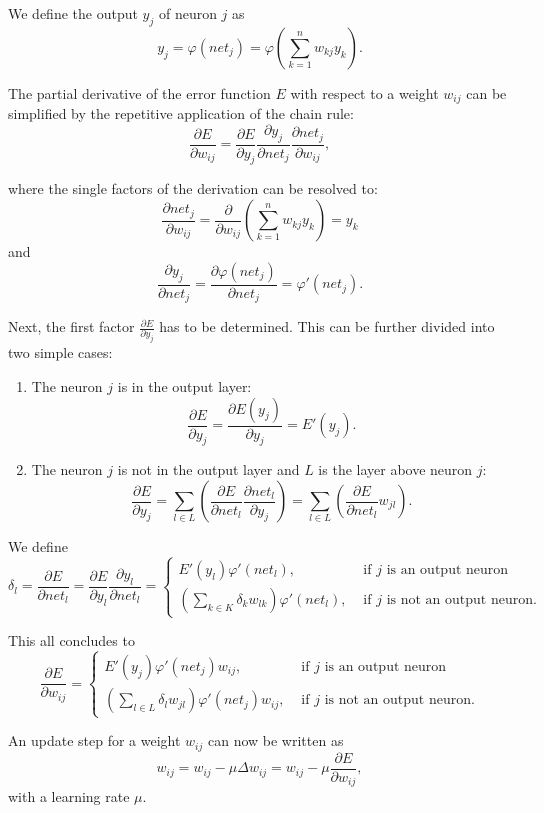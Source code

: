 We define the output $y_j$ of neuron $j$ as
\[
	y_j = \varphi(net_j) = \varphi(\sum_{k=1}^n w_{kj} y_k) .
\]
 
The partial derivative of the error function $E$ with respect to a weight $w_{ij}$ can be simplified by the repetitive application of the chain rule:
\[
	\frac{\partial E}{\partial w_{ij}} = \frac{\partial E}{\partial y_j} \frac{\partial y_j}{\partial net_j} \frac{\partial net_j}{\partial w_{ij}} ,
\]
 
where the single factors of the derivation can be resolved to:
\[
	\frac{\partial net_j}{\partial w_{ij}} = \frac{\partial}{\partial w_{ij}} ( \sum_{k=1}^n w_{kj} y_k ) = y_k
\]
and 
\[
	\frac{\partial y_j}{\partial net_j} =  \frac{\partial \varphi(net_j)}{\partial net_j} = \varphi'(net_j).
\]


Next, the first factor $\frac{\partial E}{\partial y_j}$ has to be determined. This can be further divided into two simple cases:
\begin{enumerate}
\item The neuron $j$ is in the output layer:
\[
\frac{\partial E}{\partial y_j} = \frac{\partial E(y_j)}{\partial y_j} = E'(y_j).
\] 

\item The neuron $j$ is not in the output layer and $L$ is the layer above neuron $j$:
\[
\frac{\partial E}{\partial y_j} = \sum_{l \in L}( \frac{\partial E}{\partial net_l} \frac{\partial net_l}{\partial y_j} )  = \sum_{l \in L}( \frac{\partial E}{\partial net_l} w_{jl} ).
\] 
\end{enumerate}
 
We define 
\[
\delta_l = \frac{\partial E}{\partial net_l} = \frac{\partial E}{\partial y_l} \frac{\partial y_l}{\partial net_l} =
\begin{cases}
E'(y_l) \varphi'(net_l), & \text{  if } j \text{ is an output neuron} \\
(\sum_{k \in K} \delta_k w_{lk}) \varphi'(net_l), & \text{  if } j \text{ is not an output neuron.}
\end{cases}
\]

This all concludes to 
\[
\frac{\partial E}{\partial w_{ij}} = 
\begin{cases}
E'(y_j) \varphi'(net_j) w_{ij}, & \text{  if } j \text{ is an output neuron} \\
(\sum_{l \in L} \delta_l w_{jl}) \varphi'(net_j) w_{ij}, & \text{  if } j \text{ is not an output neuron.}
\end{cases}
\]

An update step for a weight $w_{ij}$ can now be written as
\[
w_{ij} = w_{ij} - \mu \Delta w_{ij} = w_{ij} - \mu \frac{\partial E}{\partial w_{ij}},
\]
with a learning rate $\mu$.


